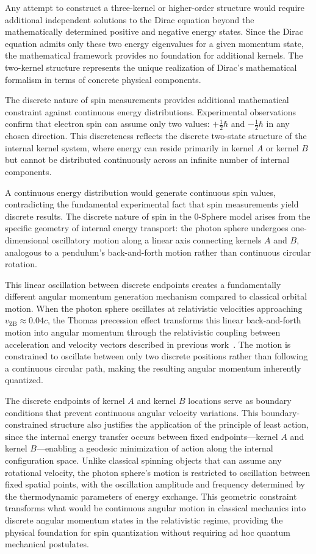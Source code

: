 \documentclass[%
 reprint,
 amsmath,amssymb,
 aps,
]{revtex4-1}
\numberwithin{equation}{section}%
\begin{document}
Any attempt to construct a three-kernel or higher-order structure would require additional independent solutions to the Dirac equation beyond the mathematically determined positive and negative energy states. Since the Dirac equation admits only these two energy eigenvalues for a given momentum state, the mathematical framework provides no foundation for additional kernels. The two-kernel structure represents the unique realization of Dirac's mathematical formalism in terms of concrete physical components.

The discrete nature of spin measurements provides additional mathematical constraint against continuous energy distributions. Experimental observations confirm that electron spin can assume only two values: $+\frac{1}{2}\hbar$ and $-\frac{1}{2}\hbar$ in any chosen direction. This discreteness reflects the discrete two-state structure of the internal kernel system, where energy can reside primarily in kernel $A$ or kernel $B$ but cannot be distributed continuously across an infinite number of internal components.

A continuous energy distribution would generate continuous spin values, contradicting the fundamental experimental fact that spin measurements yield discrete results. The discrete nature of spin in the 0-Sphere model arises from the specific geometry of internal energy transport: the photon sphere undergoes one-dimensional oscillatory motion along a linear axis connecting kernels $A$ and $B$, analogous to a pendulum's back-and-forth motion rather than continuous circular rotation.

This linear oscillation between discrete endpoints creates a fundamentally different angular momentum generation mechanism compared to classical orbital motion. When the photon sphere oscillates at relativistic velocities approaching $v_{\text{ZB}} \approx 0.04c$, the Thomas precession effect transforms this linear back-and-forth motion into angular momentum through the relativistic coupling between acceleration and velocity vectors described in previous work~\cite{hanamura2309.0047}. The motion is constrained to oscillate between only two discrete positions rather than following a continuous circular path, making the resulting angular momentum inherently quantized.

The discrete endpoints of kernel $A$ and kernel $B$ locations serve as boundary conditions that prevent continuous angular velocity variations. This boundary-constrained structure also justifies the application of the principle of least action, since the internal energy transfer occurs between fixed endpoints—kernel $A$ and kernel $B$—enabling a geodesic minimization of action along the internal configuration space. Unlike classical spinning objects that can assume any rotational velocity, the photon sphere's motion is restricted to oscillation between fixed spatial points, with the oscillation amplitude and frequency determined by the thermodynamic parameters of energy exchange. This geometric constraint transforms what would be continuous angular motion in classical mechanics into discrete angular momentum states in the relativistic regime, providing the physical foundation for spin quantization without requiring ad hoc quantum mechanical postulates.
\end{document}
